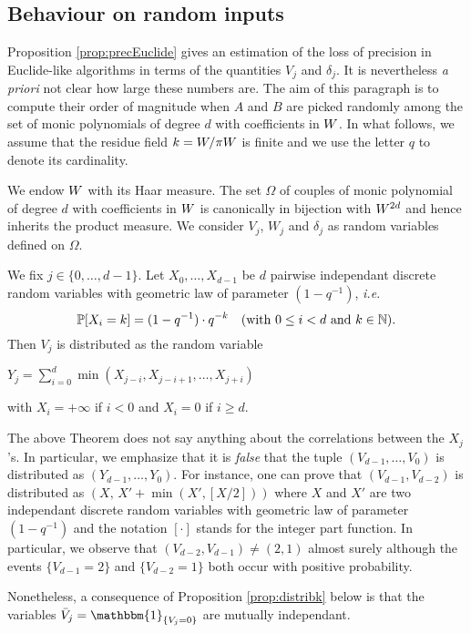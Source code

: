 \documentclass{article}
\begin{document}
\subsection{Behaviour on random inputs}
\label{subsec:proba}

Proposition \ref{prop:precEuclide} gives an estimation of the loss of 
precision in Euclide-like algorithms in terms of the quantities $V_j$ 
and $\delta_j$. It is nevertheless \emph{a priori} not clear how large 
these numbers are. The aim of this paragraph is to compute their order 
of magnitude when $A$ and $B$ are picked randomly among the set of monic 
polynomials of degree $d$ with coefficients in $W$. In what follows, we 
assume that the residue field $k = W/\pi W$ is finite and we use the 
letter $q$ to denote its cardinality.

We endow $W$ with its Haar measure. The set $\Omega$ of couples of 
monic polynomial of degree $d$ with coefficients in $W$ is canonically 
in bijection with $W^{2d}$ and hence inherits the product measure. 
We consider $V_j$, $W_j$ and $\delta_j$ as random variables defined on 
$\Omega$.

\begin{theo}
\label{th:lawVj}
We fix $j \in \{0, \ldots, d-1\}$.
Let $X_0, \ldots, X_{d-1}$ be $d$ pairwise independant discrete random 
variables with geometric law of parameter $(1 - q^{-1})$, \emph{i.e.}
$$\mathbb P[X_i = k] = (1 - q^{-1}) \cdot q^{-k} \quad 
\text{(with } 0 \leq i < d \text{ and } k \in \mathbb N \text{)}.$$
Then $V_j$ is distributed as the random variable
\begin{center}
$\displaystyle Y_j = \sum_{i=0}^d \min(X_{j-i}, X_{j-i+1}, \ldots, X_{j+i})$
\end{center}
\noindent
with $X_i = +\infty$ if $i < 0$ and $X_i = 0$ if $i \geq d$.
\end{theo}

\begin{rem}
The above Theorem does not say anything about the correlations between
the $X_j$'s. In particular, we emphasize that it is \emph{false} that
the tuple $(V_{d-1}, \ldots, V_0)$ is distributed as $(Y_{d-1}, \ldots,
Y_0)$. For instance, one can prove that $(V_{d-1}, 
V_{d-2})$ is distributed as 
$(X, \, X' + \min(X', [X/2]))$
where $X$ and $X'$ are two independant discrete random variables with 
geometric law of parameter $(1 - q^{-1})$ and the notation $[\cdot]$ 
stands for the integer part function. In particular, we observe that 
$(V_{d-2}, V_{d-1}) \neq (2,1)$ almost surely although the events 
$\{V_{d-1} = 2\}$ and $\{V_{d-2} = 1\}$ both occur with positive 
probability.

Nonetheless, a consequence of Proposition \ref{prop:distribk} below is 
that the variables $\bar V_j = \mathbbm{1}_{\{V_j = 0\}}$ are mutually 
independant.
\end{rem}
\end{document}
